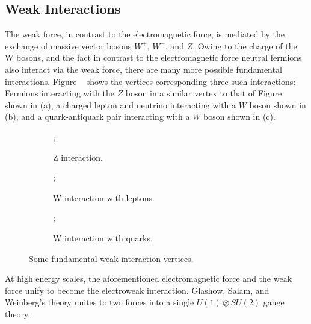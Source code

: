 \subsection{Weak Interactions}
The weak force, in contrast to the electromagnetic force, is mediated by the exchange of massive vector bosons $W^+$, $W^-$, and $Z$. Owing to the charge of the W bosons, and the fact in contrast to the electromagnetic force neutral fermions also interact via the weak force, there are many more possible fundamental interactions. Figure ~ shows the vertices corresponding three such interactions: Fermions interacting with the $Z$ boson in a similar vertex to that of Figure ~ shown in (a), a charged lepton and neutrino interacting with a $W$ boson shown in (b), and a quark-antiquark pair interacting with a $W$ boson shown in (c).

\begin{figure}[h!]
    \begin{subfigure}{.5\textwidth}
        \centering
        ;
        \caption{Z interaction.}
        \label{fig:EWvertexa}
    \end{subfigure}
    \begin{subfigure}{.5\textwidth}
        \centering
        ;
        \caption{W interaction with leptons.}
        \label{fig:EWVertexb}
    \end{subfigure}
    \newline
    \begin{subfigure}{1\textwidth}
        \centering
        ;
        \caption{W interaction with quarks.}
        \label{fig:EWVertexc}
    \end{subfigure}
    \caption{Some fundamental weak interaction vertices.}
    \label{fig:EWVertices}
\end{figure}

At high energy scales, the aforementioned electromagnetic force and the weak force unify to become the electroweak interaction. Glashow, Salam, and Weinberg's theory unites to two forces into a single $U(1) \otimes SU(2)$ gauge theory. 

